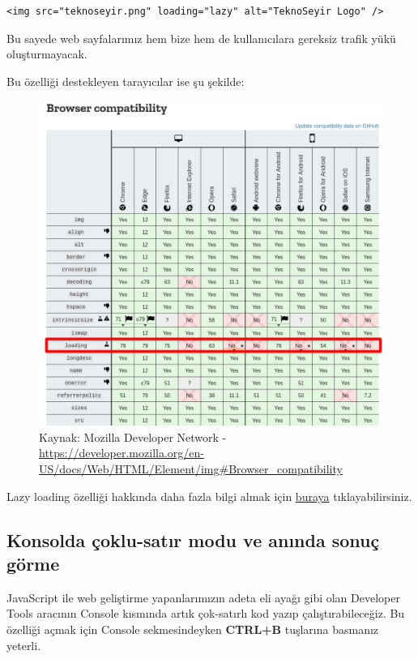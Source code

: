 \documentclass[11pt]{article}
\begin{document}
\begin{verbatim}
<img src="teknoseyir.png" loading="lazy" alt="TeknoSeyir Logo" />
\end{verbatim}
Bu sayede web sayfalarımız hem bize hem de kullanıcılara gereksiz trafik yükü
oluşturmayacak.

Bu özelliği destekleyen tarayıcılar ise şu şekilde:

\begin{figure}[htbp]
\centering
\includegraphics[width=.9\linewidth]{gorseller/lazy-loading-uyumluluk.png}
\caption[//developer.mozilla.org/en-US/docs/Web/HTML/Element/img\#Browser\_compatibility]{Kaynak: Mozilla Developer Network - \url{https://developer.mozilla.org/en-US/docs/Web/HTML/Element/img\#Browser\_compatibility}}
\end{figure}
\newpage

Lazy loading özelliği hakkında daha fazla bilgi almak için \href{https://developer.mozilla.org/en-US/docs/Web/Performance/Lazy\_loading}{buraya}
tıklayabilirsiniz.
\subsection{Konsolda çoklu-satır modu ve anında sonuç görme}
\label{sec:orgca2cbaa}
JavaScript ile web geliştirme yapanlarımızın adeta eli ayağı gibi olan
Developer Tools aracının Console kısmında artık çok-satırlı kod yazıp
çalıştırabileceğiz. Bu özelliği açmak için Console sekmesindeyken \textbf{CTRL+B}
tuşlarına basmanız yeterli.
\end{document}
